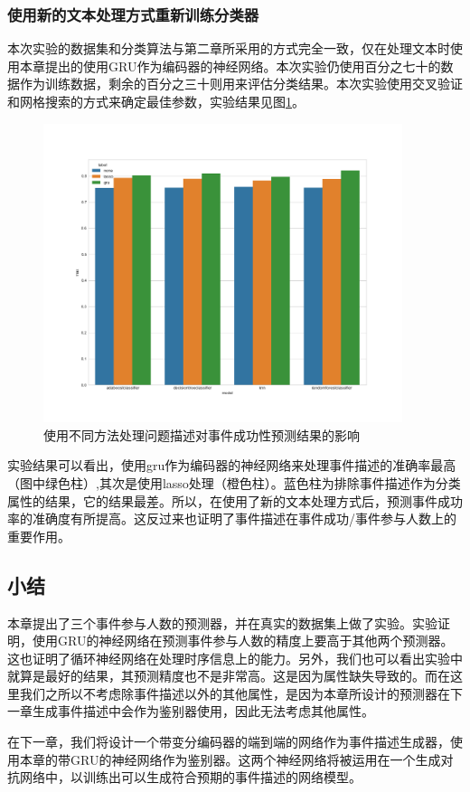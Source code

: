 \documentclass[12pt]{template}
\begin{document}
\subsubsection{使用新的文本处理方式重新训练分类器}
本次实验的数据集和分类算法与第二章所采用的方式完全一致，仅在处理文本时使用本章提出的使用GRU作为编码器的神经网络。本次实验仍使用百分之七十的数据作为训练数据，剩余的百分之三十则用来评估分类结果。本次实验使用交叉验证和网格搜索的方式来确定最佳参数，实验结果见图\ref{f25}。
\begin{figure}[htbp]
    \centering
    \includegraphics[width=10.5cm]{f25.png}
    \caption{使用不同方法处理问题描述对事件成功性预测结果的影响}
    \label{f25}
\end{figure}

实验结果可以看出，使用gru作为编码器的神经网络来处理事件描述的准确率最高（图中绿色柱）,其次是使用lasso处理（橙色柱）。蓝色柱为排除事件描述作为分类属性的结果，它的结果最差。所以，在使用了新的文本处理方式后，预测事件成功率的准确度有所提高。这反过来也证明了事件描述在事件成功/事件参与人数上的重要作用。
\subsection{小结}
本章提出了三个事件参与人数的预测器，并在真实的数据集上做了实验。实验证明，使用GRU的神经网络在预测事件参与人数的精度上要高于其他两个预测器。这也证明了循环神经网络在处理时序信息上的能力。另外，我们也可以看出实验中就算是最好的结果，其预测精度也不是非常高。这是因为属性缺失导致的。而在这里我们之所以不考虑除事件描述以外的其他属性，是因为本章所设计的预测器在下一章生成事件描述中会作为鉴别器使用，因此无法考虑其他属性。

在下一章，我们将设计一个带变分编码器的端到端的网络作为事件描述生成器，使用本章的带GRU的神经网络作为鉴别器。这两个神经网络将被运用在一个生成对抗网络中，以训练出可以生成符合预期的事件描述的网络模型。
\end{document}
